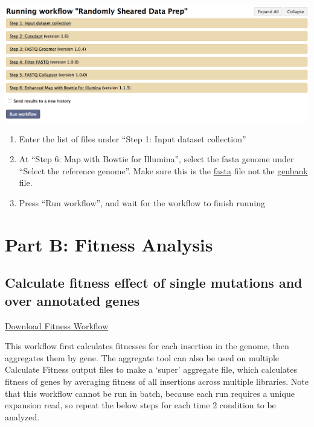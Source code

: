 \documentclass[11pt,]{article}
\providecommand{\tightlist}{%
  \setlength{\itemsep}{0pt}\setlength{\parskip}{0pt}}
\begin{document}
\centerline{\includegraphics[width=0.8\linewidth]{figs/Random.png}}

\begin{enumerate}
\def\labelenumi{\arabic{enumi}.}
\setcounter{enumi}{2}
\tightlist
\item
  Enter the list of files under ``Step 1: Input dataset collection''
\item
  At ``Step 6: Map with Bowtie for Illumina'', select the fasta genome
  under ``Select the reference genome''. Make sure this is the
  \href{https://en.wikipedia.org/wiki/FASTQ_format}{fasta} file not the
  \href{https://www.ncbi.nlm.nih.gov/Sitemap/samplerecord.html}{genbank}
  file.
\item
  Press ``Run workflow'', and wait for the workflow to finish running
\end{enumerate}

\newpage

\section{Part B: Fitness Analysis}\label{part-b-fitness-analysis}

\subsection{Calculate fitness effect of single mutations and over
annotated
genes}\label{calculate-fitness-effect-of-single-mutations-and-over-annotated-genes}

\href{https://raw.githubusercontent.com/vanOpijnenLab/magenta-p2/blob/master/workflows/Calculate\%20Fitnesses\%20:\%20Aggregate\%20Fitnesses.ga}{Download
Fitness Workflow}

This workflow first calculates fitnesses for each insertion in the
genome, then aggregates them by gene. The aggregate tool can also be
used on multiple Calculate Fitness output files to make a `super'
aggregate file, which calculates fitness of genes by averaging fitness
of all insertions across multiple libraries. Note that this workflow
cannot be run in batch, because each run requires a unique expansion
read, so repeat the below steps for each time 2 condition to be
analyzed.
\end{document}
